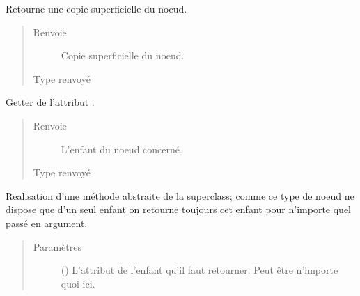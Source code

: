 \documentclass[letterpaper,10pt,french]{sphinxmanual}
\begin{document}
\begin{fulllineitems}

\begin{fulllineitems}
\label{\detokenize{index:StrategyTree.Repair.copy}}
Retourne une copie superficielle du noeud.
\begin{quote}\begin{description}
\item[{Renvoie}] \leavevmode
{} \textendash{} Copie superficielle du noeud.

\item[{Type renvoyé}] \leavevmode
{\hyperref[\detokenize{index:StrategyTree.Repair}]{}}

\end{description}\end{quote}

\end{fulllineitems}


\begin{fulllineitems}
\label{\detokenize{index:StrategyTree.Repair.get_child}}
Getter de l’attribut .
\begin{quote}\begin{description}
\item[{Renvoie}] \leavevmode
{} \textendash{} L’enfant du noeud concerné.

\item[{Type renvoyé}] \leavevmode
{\hyperref[\detokenize{index:StrategyTree.NodeST}]{}}

\end{description}\end{quote}

\end{fulllineitems}


\begin{fulllineitems}
\label{\detokenize{index:StrategyTree.Repair.get_child_by_attribute}}
Realisation d’une méthode abstraite de la superclass; comme ce type de
noeud ne dispose que d’un seul enfant on retourne toujours cet enfant
pour n’importe quel  passé en argument.
\begin{quote}\begin{description}
\item[{Paramètres}] \leavevmode
{} () \textendash{} L’attribut de l’enfant qu’il faut retourner. Peut être n’importe
quoi ici.


\end{description}
\end{quote}
\end{fulllineitems}
\end{fulllineitems}
\end{document}
